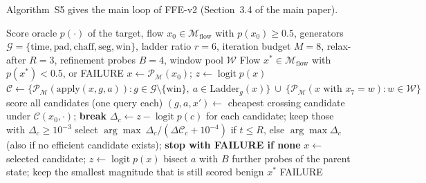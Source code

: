 Algorithm~S5 gives the main loop of FFE-v2 (Section~3.4 of the main paper).

\begin{algorithm}[!t]
\footnotesize\linespread{1}\selectfont
\caption{FFE-v2 (score-only)}
\label{alg:ffev2}
\begin{algorithmic}[1]
\REQUIRE Score oracle $p(\cdot)$ of the target, flow $x_0\in\mathcal{M}_{\text{flow}}$ with $p(x_0)\ge0.5$, generators $\mathcal{G}=\{\text{time},\text{pad},\text{chaff},\text{seg},\text{win}\}$, ladder ratio $r=6$, iteration budget $M=8$, relax-after $R=3$, refinement probes $B=4$, window pool $\mathcal{W}$
\ENSURE Flow $x^*\in\mathcal{M}_{\text{flow}}$ with $p(x^*)<0.5$, or FAILURE
\STATE $x\leftarrow\mathcal{P}_{\mathcal{M}}(x_0)$; $z\leftarrow\operatorname{logit}p(x)$
    \STATE $\mathcal{C}\leftarrow\{\mathcal{P}_{\mathcal{M}}(\text{apply}(x,g,a)) : g\in\mathcal{G}\setminus\{\text{win}\},\ a\in\text{Ladder}_g(x)\}\ \cup\ \{\mathcal{P}_{\mathcal{M}}(x\text{ with }x_7{=}w) : w\in\mathcal{W}\}$ 
    \STATE score all candidates (one query each)
        \STATE $(g,a,x')\leftarrow$ cheapest crossing candidate under $\mathcal{C}(x_0,\cdot)$; \textbf{break}
    \ENDIF
    \STATE $\Delta_c\leftarrow z-\operatorname{logit}p(c)$ for each candidate; keep those with $\Delta_c\ge10^{-3}$
    \STATE select $\arg\max\ \Delta_c/(\Delta\mathcal{C}_c+10^{-4})$ if $t\le R$, else $\arg\max\Delta_c$ (also if no efficient candidate exists); \textbf{stop with FAILURE if none}
    \STATE $x\leftarrow$ selected candidate; $z\leftarrow\operatorname{logit}p(x)$
\ENDFOR
{}
    \STATE bisect $a$ with $B$ further probes of the parent state; keep the smallest magnitude that is still scored benign
    \RETURN $x^*$
\ENDIF
\RETURN FAILURE
\end{algorithmic}
\end{algorithm}
